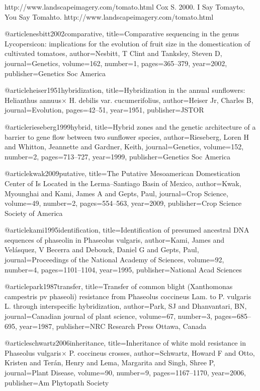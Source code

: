 http://www.landscapeimagery.com/tomato.html
Cox S. 2000. I Say Tomayto, You Say Tomahto. http://www.landscapeimagery.com/tomato.html

@article{nesbitt2002comparative,
  title={Comparative sequencing in the genus Lycopersicon: implications for the evolution of fruit size in the domestication of cultivated tomatoes},
  author={Nesbitt, T Clint and Tanksley, Steven D},
  journal={Genetics},
  volume={162},
  number={1},
  pages={365--379},
  year={2002},
  publisher={Genetics Soc America}
}

@article{heiser1951hybridization,
  title={Hybridization in the annual sunflowers: Helianthus annuus$\times$ H. debilis var. cucumerifolius},
  author={Heiser Jr, Charles B},
  journal={Evolution},
  pages={42--51},
  year={1951},
  publisher={JSTOR}
}

@article{rieseberg1999hybrid,
  title={Hybrid zones and the genetic architecture of a barrier to gene flow between two sunflower species},
  author={Rieseberg, Loren H and Whitton, Jeannette and Gardner, Keith},
  journal={Genetics},
  volume={152},
  number={2},
  pages={713--727},
  year={1999},
  publisher={Genetics Soc America}
}

@article{kwak2009putative,
  title={The Putative Mesoamerican Domestication Center of Is Located in the Lerma--Santiago Basin of Mexico},
  author={Kwak, Myounghai and Kami, James A and Gepts, Paul},
  journal={Crop Science},
  volume={49},
  number={2},
  pages={554--563},
  year={2009},
  publisher={Crop Science Society of America}
}

@article{kami1995identification,
  title={Identification of presumed ancestral DNA sequences of phaseolin in Phaseolus vulgaris},
  author={Kami, James and Vel{\'a}squez, V Becerra and Debouck, Daniel G and Gepts, Paul},
  journal={Proceedings of the National Academy of Sciences},
  volume={92},
  number={4},
  pages={1101--1104},
  year={1995},
  publisher={National Acad Sciences}
}

@article{park1987transfer,
  title={Transfer of common blight (Xanthomonas campestris pv phaseoli) resistance from Phaseolus coccineus Lam. to P. vulgaris L. through interspecific hybridization},
  author={Park, SJ and Dhanvantari, BN},
  journal={Canadian journal of plant science},
  volume={67},
  number={3},
  pages={685--695},
  year={1987},
  publisher={NRC Research Press Ottawa, Canada}
}

@article{schwartz2006inheritance,
  title={Inheritance of white mold resistance in Phaseolus vulgaris$\times$ P. coccineus crosses},
  author={Schwartz, Howard F and Otto, Kristen and Ter{\'a}n, Henry and Lema, Margarita and Singh, Shree P},
  journal={Plant Disease},
  volume={90},
  number={9},
  pages={1167--1170},
  year={2006},
  publisher={Am Phytopath Society}
}

